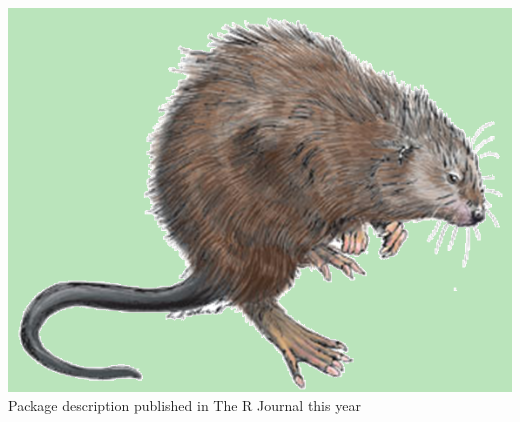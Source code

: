 \documentclass[serif]{beamer}\usepackage[]{graphicx}\usepackage[]{color}
\begin{document}
\begin{frame}[fragile]{\includegraphics[width=0.05\paperwidth]{fig/muskrat.png}\hspace{0.07in}{\bf SWMPrats.net: The SWMPr package}}
Package description published in The R Journal this year \\~\\ 
\centerline{}
\end{frame}
\end{document}
